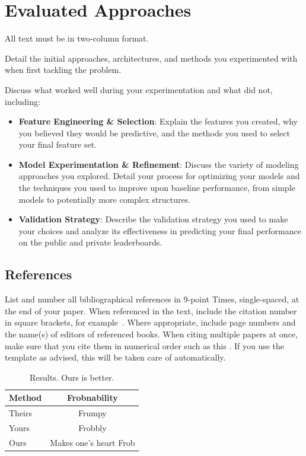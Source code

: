 \section{Evaluated Approaches}
\label{sec:approaches}

All text must be in two-column format.

Detail the initial approaches, architectures, and methods you experimented with when first tackling the problem.

Discuss what worked well during your experimentation and what did not, including:

\begin{itemize}
    \item \textbf{Feature Engineering \& Selection}: Explain the features you created, why you believed they
would be predictive, and the methods you used to select your final feature set.
    \item \textbf{Model Experimentation \& Refinement}: Discuss the variety of modeling approaches you
explored. Detail your process for optimizing your models and the techniques you used to
improve upon baseline performance, from simple models to potentially more complex
structures.
    \item \textbf{Validation Strategy}: Describe the validation strategy you used to make your choices and analyze its
effectiveness in predicting your final performance on the public and private leaderboards.

\end{itemize}

\subsection{References}

List and number all bibliographical references in 9-point Times, single-spaced, at the end of your paper.
When referenced in the text, include the citation number in square brackets, for
example~\cite{Authors14}.
Where appropriate, include page numbers and the name(s) of editors of referenced books.
When citing multiple papers at once, make sure that you cite them in numerical order such as this \cite{Alpher02,Alpher03,Alpher05,Authors14b,Authors14}.
If you use the template as advised, this will be taken care of automatically.

\begin{table}[h!]
  \caption{Results.   Ours is better.}
  \label{tab:example}
  \centering
  \begin{tabular}{@{}lc@{}}
    \toprule
    Method & Frobnability \\
    \midrule
    Theirs & Frumpy \\
    Yours & Frobbly \\
    Ours & Makes one's heart Frob\\
    \bottomrule
  \end{tabular}
\end{table}

